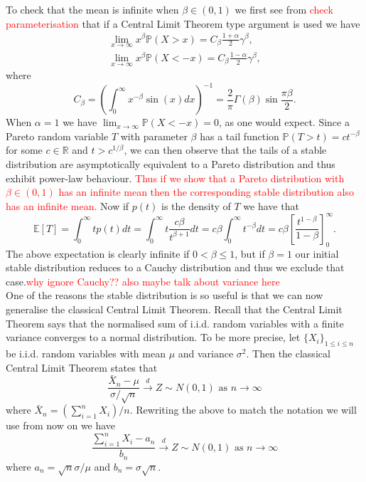 \documentclass[honours,12pt]{UNSWthesis}
\newcommand{\R}{\mathbb{R}}
\newcommand{\PP}{\mathbb{P}}
\newcommand{\E}{\mathbb{E}}
\newcommand{\1}{\mathbf 1}
\numberwithin{equation}{section}
\theoremstyle{definition}
\theoremstyle{remark}
\begin{document}
\noindent To check that the mean is infinite when $\beta \in (0,1)$ we first see from \cite{Janicki and Weron}\textcolor{red}{check parameterisation} that if a Central Limit Theorem type argument is used we have
\begin{align}
\lim_{x\to\infty} x^\beta\PP(X>x)=C_\beta\frac{1+\alpha}{2}\gamma^\beta,\\
\lim_{x\to\infty} x^\beta\PP(X<-x)=C_\beta\frac{1-\alpha}{2}\gamma^\beta,
\end{align}
\noindent where
\[
	C_\beta=\left(\int^\infty_0 x^{-\beta} \sin(x) dx  \right)^{-1}=\frac{2}{\pi}\Gamma(\beta)\sin\frac{\pi\beta}{2}.
\]
\noindent When $\alpha=1$ we have $\lim_{x\to\infty}\PP(X<-x)=0$, as one would expect. Since a Pareto random variable $T$ with parameter $\beta$ has a tail function $\PP(T>t)=ct^{-\beta}$ for some $c\in \R$ and $t>c^{1/\beta}$, we can then observe that the tails of a stable distribution are asymptotically equivalent to a Pareto distribution and thus exhibit power-law behaviour. \textcolor{red}{Thus if we show that a Pareto distribution with $\beta \in (0,1)$ has an infinite mean then the corresponding stable distribution also has an infinite mean.} Now if $p(t)$ is the density of $T$ we have that 
\[
	\E[T]=\int^\infty_0 tp(t)dt = \int^\infty_0 t\frac{c\beta}{t^{\beta+1}}dt = c\beta\int^\infty_0 t^{-\beta}dt = c\beta \left[\frac{t^{1-\beta}}{1-\beta}\right]^\infty_0.
\]
The above expectation is clearly infinite if $0<\beta\leq1$, but if $\beta=1$ our initial stable distribution reduces to a Cauchy distribution and thus we exclude that case.\textcolor{red}{why ignore Cauchy?? also maybe talk about variance here}\\

One of the reasons the stable distribution is so useful is that we can now generalise the classical Central Limit Theorem. Recall that the Central Limit Theorem says that the normalised sum of i.i.d. random variables with a finite variance converges to a normal distribution. To be more precise, let $\{X_i\}_{1\leq i \leq n}$ be i.i.d. random variables with mean $\mu$ and variance $\sigma^2$. Then the classical Central Limit Theorem states that
\[
	\frac{\bar{X}_n-\mu}{\sigma/\sqrt{n}} \overset{d}{\to}Z \sim N(0,1) \textrm{ as 				$n\to\infty$}
\]
where $\bar{X}_n=(\sum^n_{i=1}X_i)/n$. Rewriting the above to match the notation we will use from now on we have
\[
	\frac{\sum^n_{i=1}X_i-a_n}{b_n} \overset{d}{\to}Z \sim N(0,1) \textrm{ as $n\to\infty$}
\]
where $a_n=\sqrt{n}\sigma/\mu$ and $b_n=\sigma\sqrt{n}.$\\
\end{document}

